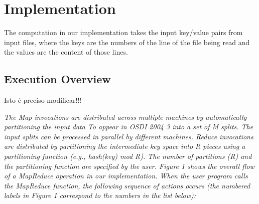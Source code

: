 \section {Implementation}

The computation in our implementation takes the input key/value pairs from input files, where the keys are the numbers of the line of the file being read and the values are the content of those lines.

\subsection {Execution Overview}


{\LARGE{Isto é preciso modificar!!!}}

 \it\tiny
The Map invocations are distributed across multiple
machines by automatically partitioning the input data
To appear in OSDI 2004 3
into a set of M splits. The input splits can be processed
in parallel by different machines. Reduce invocations
are distributed by partitioning the intermediate key
space into R pieces using a partitioning function (e.g.,
hash(key) mod R). The number of partitions (R) and
the partitioning function are specified by the user.
Figure 1 shows the overall flow of a MapReduce operation
in our implementation. When the user program
calls the MapReduce function, the following sequence
of actions occurs (the numbered labels in Figure 1 correspond
to the numbers in the list below):

